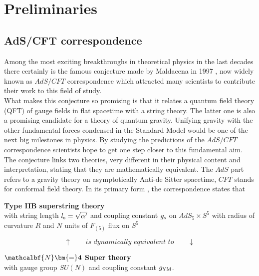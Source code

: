\section{Preliminaries}
\subsection{AdS/CFT correspondence}
%
%
Among the most exciting breakthroughs in theoretical physics in the last decades there certainly is the famous conjecture made by Maldacena in 1997 \cite{maldacena1}, now widely known as $AdS/CFT$ correspondence which attracted many scientists to contribute their work to this field of study.\\
What makes this conjecture so promising is that it relates a quantum field theory (QFT) of gauge fields in flat spacetime with a string theory. The latter one is also a promising candidate for a theory of quantum gravity. Unifying gravity with the other fundamental forces condensed in the Standard Model would be one of the next big milestones in physics. By studying the predictions of the $AdS/CFT$ correspondence scientists hope to get one step closer to this fundamental aim. 
The conjecture links two theories, very different in their physical content and interpretation, stating that they are mathematically equivalent.
The $AdS$ part refers to a gravity theory on asymptotically Anti-de Sitter spacetime,  $CFT$ stands for conformal field theory. In its primary form \cite{Ammon:2015wua}, the correspondence states that \\[0.2cm]
%
%
%
\begin{tcolorbox}[colback=white!95!black, colframe=white!90!black]
\begin{center}
\textbf{Type IIB superstring theory} \\
with string length $l_{\rm s}=\sqrt{\alpha'}$ and coupling constant $g_{\rm s}$ on $AdS_{5}\times S^{5}$ with radius of curvature $R$ and $N$ units of $F_{(5)}$ flux on $S^{5}$
\end{center}
\end{tcolorbox}
%
\begin{equation*}
\uparrow \qquad \textit{is dynamically equivalent to} \qquad \downarrow
\end{equation*}\hspace{1mm}
%
%
\begin{tcolorbox}[colback=white!95!black, colframe=white!90!black]
\begin{center}
\textbf{$\mathcalbf{N}\bm{=}\mathbf{4}$ Super  theory}\\
with gauge group $SU(N)$ and  coupling constant $g_{\rm YM}$.
\end{center}
\end{tcolorbox}
